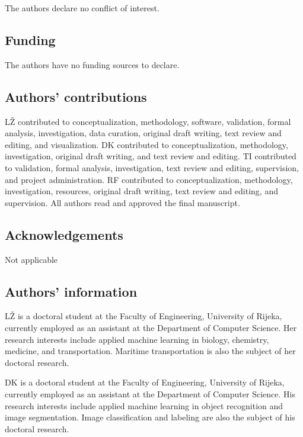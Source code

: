\let\LaTeXcline\cline\documentclass[sn-mathphys-num]{sn-jnl}\let\cline\LaTeXcline
\begin{document}
The authors declare no conflict of interest.

\subsection{Funding}

The authors have no funding sources to declare.

\subsection{Authors' contributions}

L\v{Z} contributed to conceptualization, methodology, software, validation, formal analysis, investigation, data curation, original draft writing, text review and editing, and visualization. DK contributed to conceptualization, methodology, investigation, original draft writing, and text review and editing. TI contributed to validation, formal analysis, investigation, text review and editing, supervision, and project administration. RF contributed to conceptualization, methodology, investigation, resources, original draft writing, text review and editing, and supervision. All authors read and approved the final manuscript.

\subsection{Acknowledgements}

Not applicable

\subsection{Authors' information}

L\v{Z} is a doctoral student at the Faculty of Engineering, University of Rijeka, currently employed as an assistant at the Department of Computer Science. Her research interests include applied machine learning in biology, chemistry, medicine, and transportation. Maritime transportation is also the subject of her doctoral research.

DK is a doctoral student at the Faculty of Engineering, University of Rijeka, currently employed as an assistant at the Department of Computer Science. His research interests include applied machine learning in object recognition and image segmentation. Image classification and labeling are also the subject of his doctoral research.
\end{document}
